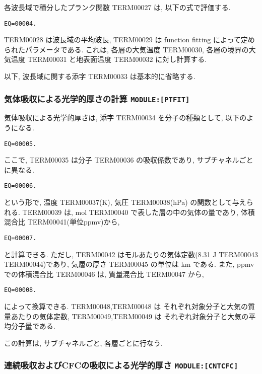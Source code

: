 各波長域で積分したプランク関数 TERM00027 は,
以下の式で評価する.

\begin{verbatim}
EQ=00004.
\end{verbatim}

TERM00028 は波長域の平均波長,
TERM00029 は function fitting によって定められたパラメータである.
これは, 各層の大気温度 TERM00030, 各層の境界の大気温度 TERM00031
と地表面温度 TERM00032 に対し計算する.

以下, 波長域に関する添字 TERM00033 は基本的に省略する.

\subsubsection{気体吸収による光学的厚さの計算 \texttt{MODULE:[PTFIT]}}

気体吸収による光学的厚さは, 添字 TERM00034 を分子の種類として,
以下のようになる. 

\begin{verbatim}
EQ=00005.
\end{verbatim}

ここで, TERM00035 は分子 TERM00036 の吸収係数であり, サブチャネルごとに異なる.

\begin{verbatim}
EQ=00006.
\end{verbatim}

という形で, 温度 TERM00037(K), 気圧 TERM00038(hPa) の関数として与えられる.
TERM00039 は, mol TERM00040 で表した層の中の気体の量であり,
体積混合比 TERM00041(単位ppmv)から,
\begin{verbatim}
EQ=00007.
\end{verbatim}
と計算できる. 
ただし, TERM00042 はモルあたりの気体定数(8.31 J TERM00043 TERM00044)であり,
気層の厚さ TERM00045 の単位は km である.
また, ppmv での体積混合比 TERM00046 は, 
質量混合比 TERM00047 から, 
\begin{verbatim}
EQ=00008.
\end{verbatim}
によって換算できる.
TERM00048,TERM00048 は
それぞれ対象分子と大気の質量あたりの気体定数,
TERM00049,TERM00049 は
それぞれ対象分子と大気の平均分子量である.

この計算は, サブチャネルごと, 各層ごとに行なう.

\subsubsection{連続吸収およびCFCの吸収による光学的厚さ \texttt{MODULE:[CNTCFC]}}


